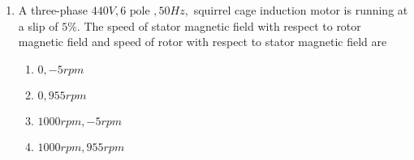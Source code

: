 \documentclass[journal]{IEEEtran}
\begin{document}
\begin{enumerate}[start=27]
\item A three-phase $440V, 6 \text{ pole }, 50Hz,$ squirrel cage induction motor is running at a slip of $5\%$. The speed of stator magnetic field with respect to rotor magnetic field and speed of rotor with respect to stator magnetic field are
\begin{multicols}{2}
\begin{enumerate}
\item $0, -5 rpm$
\item  $0, 955 rpm$
\item  $1000 rpm, -5 rpm$
\item $1000 rpm, 955 rpm$
\end{enumerate}
\end{multicols}



\end{enumerate}
\end{document}
